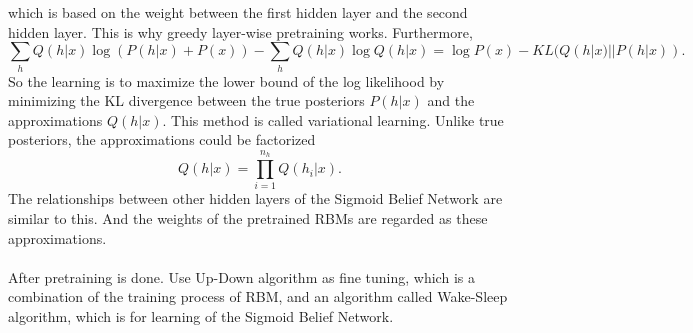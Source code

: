 \documentclass[12pt]{article}
\begin{document}
which is based on the weight between the first hidden layer and the second hidden layer. This is why greedy layer-wise pretraining works. Furthermore, \begin{equation}
\sum_h Q(h|x)\log(P(h|x) + P(x))-\sum_h Q(h|x)\log Q(h|x) = \log P(x) - KL(Q(h|x)||P(h|x)).
\end{equation}
So the learning is to maximize the lower bound of the log likelihood by minimizing the KL divergence between the true posteriors $P(h|x)$ and the approximations $Q(h|x)$. This method is called variational learning. Unlike true posteriors, the approximations could be factorized\begin{equation}
Q(h|x)=\prod_{i=1}^{n_h} Q(h_i|x).
\end{equation}
The relationships between other hidden layers of the Sigmoid Belief Network are similar to this. And the weights of the pretrained RBMs are regarded as these approximations.\\
\\
After pretraining is done. Use Up-Down algorithm as fine tuning, which is a combination of the training process of RBM, and an algorithm called Wake-Sleep algorithm, which is for learning of the Sigmoid Belief Network.
\end{document}
